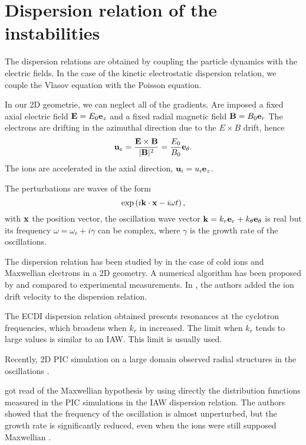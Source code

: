 
\section{Dispersion relation of the instabilities}
  \label{sec-DR-kinetic}
  
  
  The dispersion relations are obtained by coupling the particle dynamics with the electric fields.
  In the case of the kinetic electrostatic dispersion relation, we couple the Vlasov equation with the Poisson equation.
  
  In our \ac{2D} geometrie, we can neglect all of the gradients.
  Are imposed a fixed axial electric field ${\mathbf E} = E_0 {\mathbf e_z}$ and a fixed radial magnetic field ${\mathbf B} = B_0 {\mathbf e_r}$
  The electrons are drifting in the azimuthal direction due to the $E\times B$ drift, hence
  \[ {\mathbf u_{e}} = \frac{{\mathbf E} \times {\mathbf B}}{\lvert{\mathbf B}\rvert^2} = \frac{E_0}{B_0}  {\mathbf e_{\theta}}.    \]
  The ions are accelerated in the axial direction, $ {\mathbf u_i} = u_i  {\mathbf e_z}$.
  
  The perturbations are waves of the form \[ \exp \left( i {\mathbf k} \cdot {\mathbf x} - i \omega t  \right), \]
  with ${\mathbf x}$ the position vector, the oscillation wave vector ${\mathbf k} = k_r {\mathbf e_r} + k_{\theta} {\mathbf e_{\theta}}$ is real but its frequency $\omega = \omega_r + i \gamma$ can be complex, where $\gamma$ is the growth rate of the oscillations. 
  
  \vspace{1em}
  The dispersion relation has been studied by \citet{ducrocq2006} in the case of cold ions and Maxwellian electrons in a \ac{2D} geometry.
  A numerical algorithm has been proposed by \citet{cavalier2013} and compared to experimental measurements.
  In \citet{lafleur2016}, the authors added the ion drift velocity to the dispersion relation.
  
  The \ac{ECDI} dispersion relation obtained presents resonances at the cyclotron frequencies, which broadens when $k_r$ in increased.
  The limit when $k_r$ tends to large values is similar to an \ac{IAW}.
  This limit is usually used.
  
  Recently, \ac{2D} \ac{PIC} simulation on a large domain observed radial structures in the oscillations \citep{janhunen2018,hara2019a}.
  
  \citet{lafleur2018} got read of the Maxwellian hypothesis by using directly the distribution functions measured in the \ac{PIC} simulations in the \ac{IAW} dispersion relation.
  The authors showed that the frequency of the oscillation is almost unperturbed, but the growth rate is significantly reduced, even when the ions were still supposed Maxwellian \citep[F ig. 8]{lafleur2018}.
  
